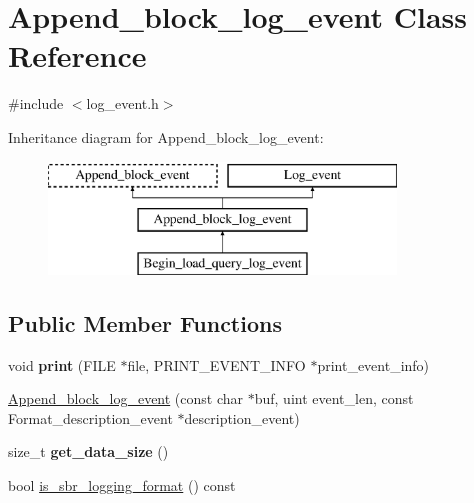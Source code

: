 \hypertarget{classAppend__block__log__event}{}\section{Append\+\_\+block\+\_\+log\+\_\+event Class Reference}
\label{classAppend__block__log__event}


{\ttfamily \#include $<$log\+\_\+event.\+h$>$}

Inheritance diagram for Append\+\_\+block\+\_\+log\+\_\+event\+:\begin{figure}[H]
\begin{center}
\leavevmode
\includegraphics[height=3.000000cm]{classAppend__block__log__event}
\end{center}
\end{figure}
\subsection*{Public Member Functions}
\begin{DoxyCompactItemize}
\item 
\mbox{\label{classAppend__block__log__event_a8272a8006f485eb6d1e42cc6e4be584c}} 
void {\bfseries print} (F\+I\+LE $\ast$file, P\+R\+I\+N\+T\+\_\+\+E\+V\+E\+N\+T\+\_\+\+I\+N\+FO $\ast$print\+\_\+event\+\_\+info)
\item 
\mbox{\hyperlink{classAppend__block__log__event_a8154c6cc6d365d7e66dbc9278cec56da}{Append\+\_\+block\+\_\+log\+\_\+event}} (const char $\ast$buf, uint event\+\_\+len, const Format\+\_\+description\+\_\+event $\ast$description\+\_\+event)
\item 
\mbox{\label{classAppend__block__log__event_a9d9957eed61da5e3fd987b4eee7dc33b}} 
size\+\_\+t {\bfseries get\+\_\+data\+\_\+size} ()
\item 
bool \mbox{\hyperlink{classAppend__block__log__event_a6f758b2da7126c0a881bcc901f481472}{is\+\_\+sbr\+\_\+logging\+\_\+format}} () const
\end{DoxyCompactItemize}
